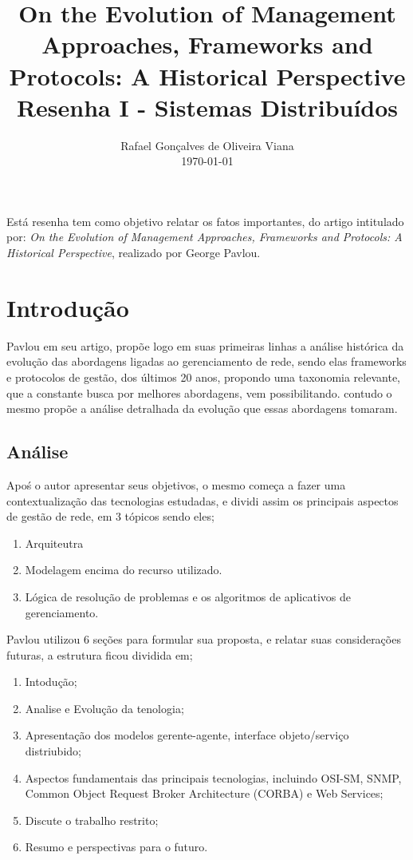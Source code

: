 \documentclass[12pt]{article}
\title{On the Evolution of Management Approaches,
		Frameworks and Protocols: A Historical Perspective\\ Resenha I - Sistemas Distribuídos}
\author{Rafael Gonçalves de Oliveira Viana\inst{1} \\\vspace*{10pt} \normalsize  \today{} }
\begin{document}
 

\maketitle

     
\begin{resumo} 	
  Está resenha tem como objetivo relatar os fatos importantes, do artigo intitulado por: \textit{On the Evolution of Management Approaches,
  Frameworks and Protocols: A Historical Perspective}, realizado por George Pavlou.
\end{resumo}



\section{Introdução}
 Pavlou em seu artigo, propõe logo em suas primeiras linhas a análise histórica da evolução das abordagens ligadas ao gerenciamento de rede, sendo elas frameworks e protocolos de gestão, dos últimos 20 anos, propondo uma taxonomia relevante, que a constante busca por melhores abordagens, vem possibilitando. contudo o mesmo propõe a análise detralhada da evolução que essas abordagens tomaram.
\subsection{Análise}
 Apoś o autor apresentar seus objetivos, o mesmo começa a fazer uma contextualização das tecnologias estudadas, e dividi assim os principais aspectos de gestão de rede, em 3 tópicos sendo eles;

	 \begin{enumerate}
	 	\item Arquiteutra
	 	\item Modelagem encima do recurso utilizado.
	 	\item Lógica de resolução de problemas e os algoritmos de aplicativos de gerenciamento.
	 \end{enumerate}
 
	Pavlou utilizou 6 seções para formular sua proposta, e relatar suas considerações futuras, a estrutura ficou dividida em; 
  \begin{enumerate}
 	\item Intodução;
 	\item Analise e Evolução da tenologia;
 	\item Apresentação dos modelos gerente-agente, interface objeto/serviço distriubido;
 	\item Aspectos fundamentais das principais tecnologias, incluindo OSI-SM, SNMP, Common Object Request Broker Architecture (CORBA) e Web Services;
 	\item Discute o trabalho restrito;
 	\item Resumo e perspectivas para o futuro.
 	
 	
 \end{enumerate}
\end{document}
